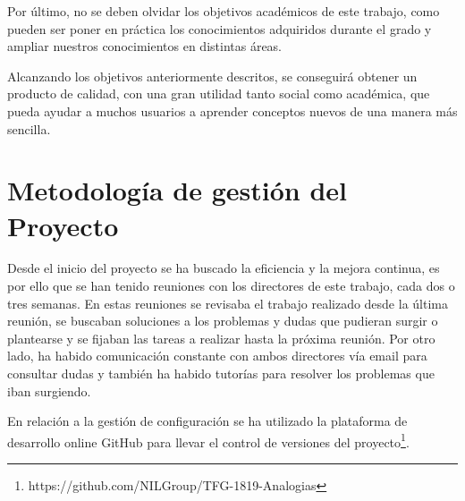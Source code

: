 Por último, no se deben olvidar los objetivos académicos de este trabajo, como pueden ser poner en práctica los conocimientos adquiridos durante el grado y ampliar nuestros conocimientos en distintas áreas. 

Alcanzando los objetivos anteriormente descritos, se conseguirá obtener un producto de calidad, con una gran utilidad tanto social como académica, que pueda ayudar a muchos usuarios a aprender conceptos nuevos de una manera más sencilla.
	
\section{Metodología de gestión del Proyecto}
\label{cap:sec:gestionProyecto}

Desde el inicio del proyecto se ha buscado la eficiencia y la mejora continua, es por ello que se han tenido reuniones con los directores de este trabajo, cada dos o tres semanas. En estas reuniones se revisaba el trabajo realizado desde la última reunión, se buscaban soluciones a los problemas y dudas que pudieran surgir o plantearse y se fijaban las tareas a realizar hasta la próxima reunión.
Por otro lado, ha habido comunicación constante con ambos directores vía email para consultar dudas y también ha habido tutorías para resolver los problemas que iban surgiendo. 

En relación a la gestión de configuración se ha utilizado la plataforma de desarrollo online GitHub para llevar el control de versiones del proyecto\footnote{https://github.com/NILGroup/TFG-1819-Analogias}.

